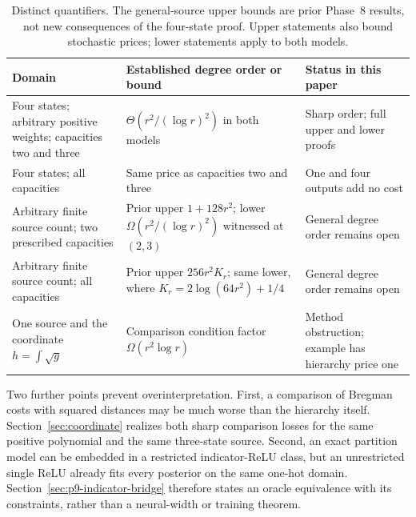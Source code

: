 \documentclass[11pt]{article}
\theoremstyle{definition}\newtheorem{definition}[theorem]{Definition}
\theoremstyle{remark}\newtheorem{remark}[theorem]{Remark}
\begin{document}
\begin{table}[ht]
\centering\small
\begin{tabular}{@{}>{\raggedright\arraybackslash}p{}>{\raggedright\arraybackslash}p{}>{\raggedright\arraybackslash}p{}@{}}
\toprule
Domain & Established degree order or bound & Status in this paper\\
\midrule
Four states; arbitrary positive weights; capacities two and three
& $\Theta(r^2/(\log r)^2)$ in both models
& Sharp order; full upper and lower proofs\\
Four states; all capacities
& Same price as capacities two and three
& One and four outputs add no cost\\
Arbitrary finite source count; two prescribed capacities
& Prior upper $1+128r^2$; lower $\Omega(r^2/(\log r)^2)$ witnessed at $(2,3)$
& General degree order remains open\\
Arbitrary finite source count; all capacities
& Prior upper $256r^2K_r$; same lower, where $K_r=2\log(64r^2)+1/4$
& General degree order remains open\\
One source and the coordinate $h=\int\sqrt g$
& Comparison condition factor $\Omega(r^2\log r)$
& Method obstruction; example has hierarchy price one\\
\bottomrule
\end{tabular}
\caption{Distinct quantifiers. The general-source upper bounds are prior
Phase~8 results, not new consequences of the four-state proof. Upper
statements also bound stochastic prices; lower statements apply to both
models.}
\label{tab:scope}
\end{table}

Two further points prevent overinterpretation. First, a comparison of
Bregman costs with squared distances may be much worse than the hierarchy
itself. Section~\ref{sec:coordinate} realizes both sharp comparison losses
for the same positive polynomial and the same three-state source. Second,
an exact partition model can be embedded in a restricted indicator-ReLU
class, but an unrestricted single ReLU already fits every posterior on the
same one-hot domain. Section~\ref{sec:p9-indicator-bridge} therefore states
an oracle equivalence with its constraints, rather than a neural-width or
training theorem.
\end{document}
